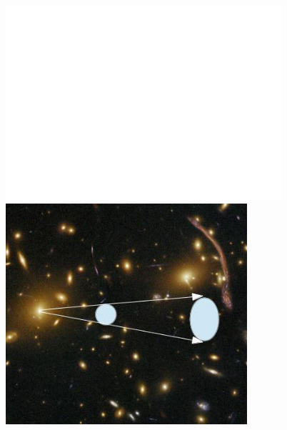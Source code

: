 \documentclass{beamer}
\begin{document}
{\begin{columns}
\begin{column}{0.5\textwidth}
\begin{itemize}
            \end{itemize}
        \end{column}
        \begin{column}{0.5\textwidth}
            \begin{center}
                \includegraphics[width=0.8\textwidth]{lens_geometry_invert.pdf}
                \newline
                \includegraphics[width=0.7\textwidth]{shear-illustration-crop2.jpg}
            \end{center}

            
        \end{column}
    \end{columns}
}
\end{document}
